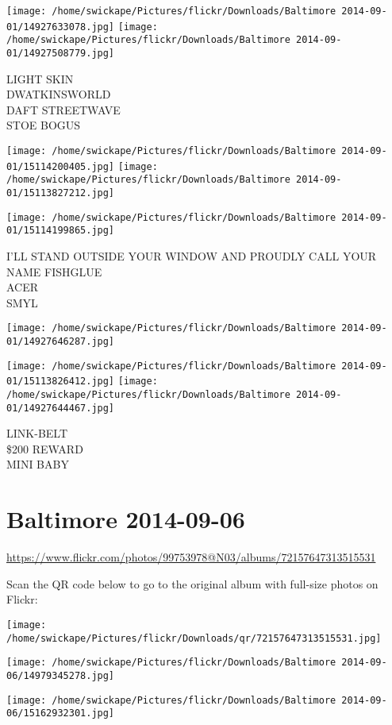 \documentclass[10pt,letterpaper]{article}
\begin{document}
\texttt{[image: /home/swickape/Pictures/flickr/Downloads/Baltimore 2014-09-01/14927633078.jpg]}
\texttt{[image: /home/swickape/Pictures/flickr/Downloads/Baltimore 2014-09-01/14927508779.jpg]}

LIGHT SKIN\\
DWATKINSWORLD\\
DAFT STREETWAVE\\
STOE BOGUS
\pagebreak

\texttt{[image: /home/swickape/Pictures/flickr/Downloads/Baltimore 2014-09-01/15114200405.jpg]}
\texttt{[image: /home/swickape/Pictures/flickr/Downloads/Baltimore 2014-09-01/15113827212.jpg]}

\texttt{[image: /home/swickape/Pictures/flickr/Downloads/Baltimore 2014-09-01/15114199865.jpg]}

I'LL STAND OUTSIDE YOUR WINDOW AND PROUDLY CALL YOUR NAME FISHGLUE\\
ACER\\
SMYL
\pagebreak

\texttt{[image: /home/swickape/Pictures/flickr/Downloads/Baltimore 2014-09-01/14927646287.jpg]}

\vspace{0.25in}
\texttt{[image: /home/swickape/Pictures/flickr/Downloads/Baltimore 2014-09-01/15113826412.jpg]}
\texttt{[image: /home/swickape/Pictures/flickr/Downloads/Baltimore 2014-09-01/14927644467.jpg]}

LINK{-}BELT\\
\$200 REWARD\\
MINI BABY
\pagebreak

\section*{Baltimore 2014-09-06}

\url{https://www.flickr.com/photos/99753978@N03/albums/72157647313515531}

Scan the QR code below to go to the original album with full-size photos on Flickr:

\texttt{[image: /home/swickape/Pictures/flickr/Downloads/qr/72157647313515531.jpg]}
\pagebreak

\texttt{[image: /home/swickape/Pictures/flickr/Downloads/Baltimore 2014-09-06/14979345278.jpg]}

\vspace{0.25in}
\texttt{[image: /home/swickape/Pictures/flickr/Downloads/Baltimore 2014-09-06/15162932301.jpg]}
\end{document}

